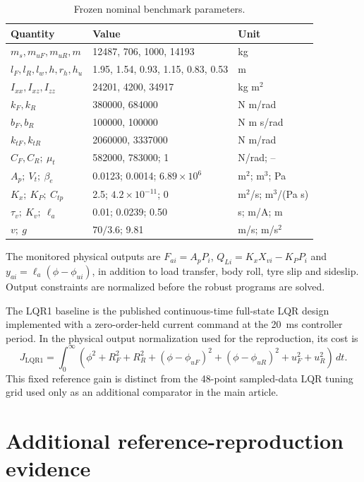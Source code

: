 \documentclass[10pt,a4paper]{article}
\begin{document}
\begin{table}[htbp]
\centering\small
\caption{Frozen nominal benchmark parameters.}
\begin{tabular}{lll}
\toprule
Quantity & Value & Unit\\
\midrule
$m_s,m_{uF},m_{uR},m$ & 12487, 706, 1000, 14193 & kg\\
$l_F,l_R,l_w,h,r_h,h_u$ & 1.95, 1.54, 0.93, 1.15, 0.83, 0.53 & m\\
$I_{xx},I_{xz},I_{zz}$ & 24201, 4200, 34917 & kg m$^2$\\
$k_F,k_R$ & 380000, 684000 & N m/rad\\
$b_F,b_R$ & 100000, 100000 & N m s/rad\\
$k_{tF},k_{tR}$ & 2060000, 3337000 & N m/rad\\
$C_F,C_R;\ \mu_t$ & 582000, 783000; 1 & N/rad; --\\
$A_p;\ V_t;\ \beta_e$ & 0.0123; 0.0014; $6.89\times10^6$ & m$^2$; m$^3$; Pa\\
$K_x;\ K_P;\ C_{tp}$ & 2.5; $4.2\times10^{-11}$; 0 & m$^2$/s; m$^3$/(Pa s)\\
$\tau_v;\ K_v;\ \ell_a$ & 0.01; 0.0239; 0.50 & s; m/A; m\\
$v;\ g$ & $70/3.6$; 9.81 & m/s; m/s$^2$\\
\bottomrule
\end{tabular}
\end{table}

The monitored physical outputs are $F_{ai}=A_pP_i$, $Q_{Li}=K_xX_{vi}-K_PP_i$ and $y_{ai}=\ell_a(\phi-\phi_{ui})$, in addition to load transfer, body roll, tyre slip and sideslip. Output constraints are normalized before the robust programs are solved.

The LQR1 baseline is the published continuous-time full-state LQR design implemented with a zero-order-held current command at the \SI{20}{ms} controller period. In the physical output normalization used for the reproduction, its cost is
\begin{equation}
J_{\mathrm{LQR1}}=\int_0^\infty
\left(\phi^2+R_F^2+R_R^2+
(\phi-\phi_{uF})^2+(\phi-\phi_{uR})^2+u_F^2+u_R^2\right)\,dt.
\end{equation}
This fixed reference gain is distinct from the 48-point sampled-data LQR tuning grid used only as an additional comparator in the main article.

\section{Additional reference-reproduction evidence}
\end{document}
